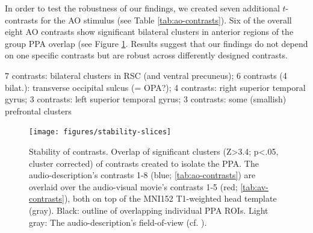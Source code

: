 \documentclass[english]{article}
\begin{document}
In order to test the robustness of our findings, we created seven additional
$t$-contrasts for the AO stimulus (see Table \ref{tab:ao-contrasts}).
Six of the overall eight AO contrasts show significant bilateral clusters in
anterior regions of the group PPA overlap (see Figure
\ref{fig:stability-slices}.
Results suggest that our findings do not depend on one specific contrasts but
are robust across differently designed contrasts.

7 contrasts: bilateral clusters in RSC (and ventral precuneus);
6 contrasts (4 bilat.): transverse occipital sulcus (= OPA?);
4 contrasts: right superior temporal gyrus; 3 contrasts: left superior temporal
gyrus; 3 contrasts: some (smallish) prefrontal clusters


\begin{figure} \centering
    \texttt{[image: figures/stability-slices]}
    \caption{Stability of contrasts. Overlap of significant clusters (Z>3.4;
        p<.05, cluster corrected) of contrasts created to isolate the PPA.
        The audio-description's contrasts 1-8 (blue; \ref{tab:ao-contrasts})
        are overlaid over the audio-visual movie's contrasts 1-5 (red;
        \ref{tab:av-contrasts}), both on top of the MNI152 T1-weighted head
        template (gray).
        Black: outline of overlapping individual PPA ROIs.
        Light gray: The audio-description's field-of-view (cf.
        \citep{hanke2014audiomovie}).}
    \label{fig:stability-slices}
    \end{figure}
\end{document}

